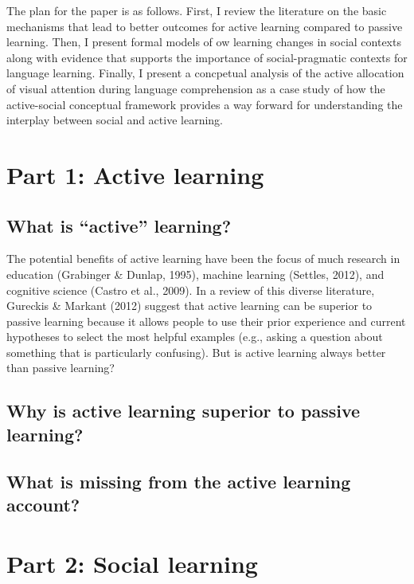 \documentclass[a4paper,man,apacite,floatsintext]{apa6}
\begin{document}
The plan for the paper is as follows. First, I review the literature on
the basic mechanisms that lead to better outcomes for active learning
compared to passive learning. Then, I present formal models of ow
learning changes in social contexts along with evidence that supports
the importance of social-pragmatic contexts for language learning.
Finally, I present a concpetual analysis of the active allocation of
visual attention during language comprehension as a case study of how
the active-social conceptual framework provides a way forward for
understanding the interplay between social and active learning.

\section{Part 1: Active learning}\label{part-1-active-learning}

\subsection{\texorpdfstring{What is ``active''
learning?}{What is active learning?}}\label{what-is-active-learning}

The potential benefits of active learning have been the focus of much
research in education (Grabinger \& Dunlap, 1995), machine learning
(Settles, 2012), and cognitive science (Castro et al., 2009). In a
review of this diverse literature, Gureckis \& Markant (2012) suggest
that active learning can be superior to passive learning because it
allows people to use their prior experience and current hypotheses to
select the most helpful examples (e.g., asking a question about
something that is particularly confusing). But is active learning always
better than passive learning?

\subsection{Why is active learning superior to passive
learning?}\label{why-is-active-learning-superior-to-passive-learning}

\subsection{What is missing from the active learning
account?}\label{what-is-missing-from-the-active-learning-account}

\section{Part 2: Social learning}\label{part-2-social-learning}
\end{document}
